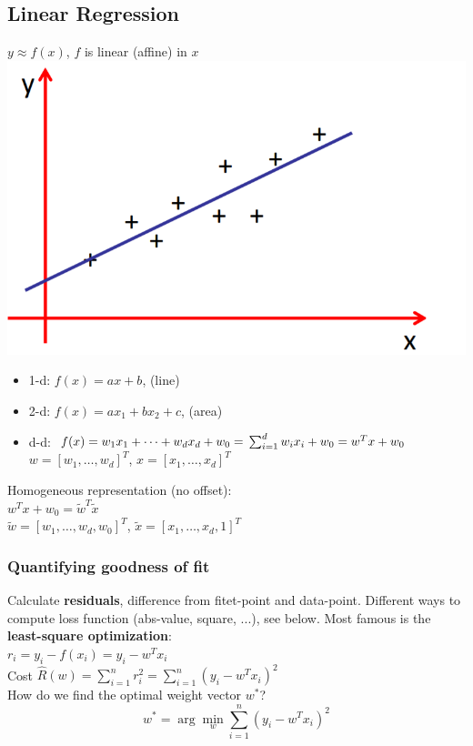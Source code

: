 \documentclass[a4paper, fontsize=8pt, landscape, DIV=1]{scrartcl}
\begin{document}
\begin{multicols*}{4}
		\subsection{Linear Regression}
		$y\approx f(x)$, $f$ is linear (affine) in $x$
		\includegraphics[width=\columnwidth]{images/Regression/linear_regression.png}
		\begin{itemize}[noitemsep]
			\item 1-d: $f(x)=ax+b$, (line)
			\item 2-d: $f(x)=ax_1+bx_2+c$, (area)
			\item d-d: $f(x)=w_1x_1+\dots+w_dx_d+w_0=\\\sum_{i=1}^{d}w_ix_i+w_0=w^Tx+w_0$\\
			$w=[w_1,\dots,w_d]^T$, $x=[x_1,\dots,x_d]^T$
		\end{itemize}
		Homogeneous representation (no offset):\\
		$w^Tx+w_0=\tilde{w}^T\tilde{x}$\\
		$\tilde{w}=[w_1,\dots,w_d,w_0]^T$, $\tilde{x}=[x_1,\dots,x_d,1]^T$\\
		
		\subsubsection{Quantifying goodness of fit}
		Calculate \textbf{residuals}, difference from fitet-point and data-point. Different ways to compute loss function (abs-value, square, ...), see below. Most famous is the \textbf{least-square optimization}: \\
		$r_i=y_i-f(x_i)=y_i-w^Tx_i$\\
		Cost $\hat{R}(w)=\sum_{i=1}^{n}r_i^2=\sum_{i=1}^{n}(y_i-w^Tx_i)^2$\\
		How do we find the optimal weight vector $w^*$?
		\begin{equation*}
			w^*=\arg\min\limits_w\sum_{i=1}^{n}(y_i-w^Tx_i)^2 
		\end{equation*}
		\columnbreak
		

\end{multicols*}
\end{document}
